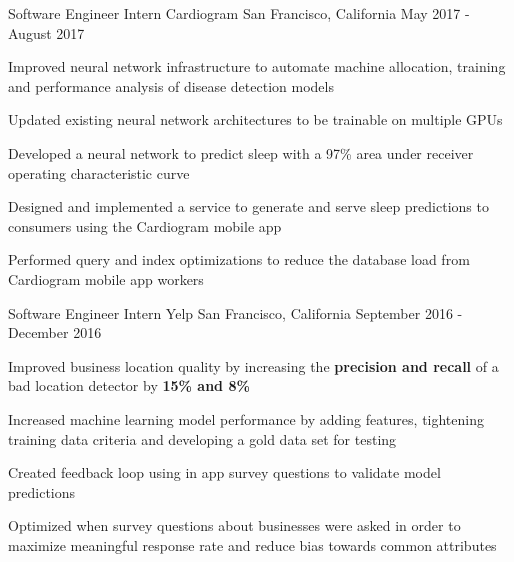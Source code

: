 


\begin{cventries}


\cventry
{Software Engineer Intern}
{Cardiogram}
{San Francisco, California}
{May 2017 - August 2017}
{ %
\begin{cvitems}
\item {Improved neural network infrastructure to automate machine allocation, training and performance analysis of disease detection models}
\item {Updated existing neural network architectures to be trainable on multiple GPUs}
\item {Developed a neural network to predict sleep with a 97\% area under receiver operating characteristic curve}
\item {Designed and implemented a service to generate and serve sleep predictions to consumers using the Cardiogram mobile app}
\item {Performed query and index optimizations to reduce the database load from Cardiogram mobile app workers }
\end{cvitems}
}


\cventry
{Software Engineer Intern}
{Yelp}
{San Francisco, California}
{September 2016 - December 2016}
{ %
\begin{cvitems}
\item {Improved business location quality by increasing the \textbf{precision and recall} of a bad location detector by \textbf{15\% and 8\%}}
\item {Increased machine learning model performance by adding features, tightening training data criteria and developing a gold data set for testing}
\item {Created feedback loop using in app survey questions to validate model predictions}
\item {Optimized when survey questions about businesses were asked in order to maximize meaningful response rate and reduce bias towards common attributes}
\end{cvitems}
}


\end{cventries}
